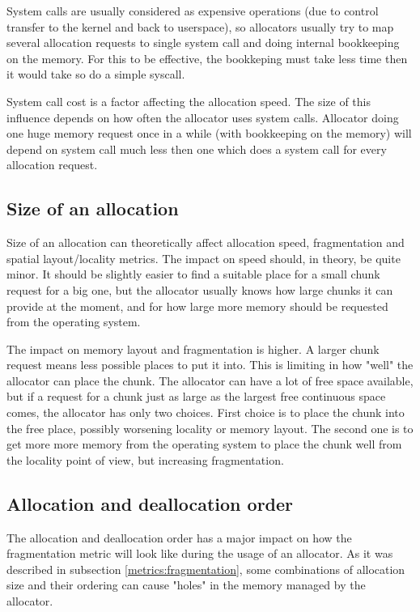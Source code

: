 System calls are usually considered as expensive operations (due to control transfer to the kernel and back to userspace), so allocators usually try to map several allocation requests to single system call and doing internal bookkeeping on the memory. For this to be effective, the bookkeping must take less time then it would take so do a simple syscall.

System call cost is a factor affecting the allocation speed. The size of this influence depends on how often the allocator uses system calls. Allocator doing one huge memory request once in a while (with bookkeeping on the memory) will depend on system call much less then one which does a system call for every allocation request.
\subsection{Size of an allocation}

Size of an allocation can theoretically affect allocation speed, fragmentation and spatial layout/locality metrics. The impact on speed should, in theory, be quite minor. It should be slightly easier to find a suitable place for a small chunk request for a big one, but the allocator usually knows how large chunks it can provide at the moment, and for how large more memory should be requested from the operating system.

The impact on memory layout and fragmentation is higher. A larger chunk request means less possible places to put it into. This is limiting in how "well" the allocator can place the chunk. The allocator can have a lot of free space available, but if a request for a chunk just as large as the largest free continuous space comes, the allocator has only two choices. First choice is to place the chunk into the free place, possibly worsening locality or memory layout. The second one is to get more more memory from the operating system to place the chunk well from the locality point of view, but increasing fragmentation.

\subsection{Allocation and deallocation order}

The allocation and deallocation order has a major impact on how the fragmentation metric will look like during the usage of an allocator. As it was described in subsection \ref{metrics:fragmentation}, some combinations of allocation size and their ordering can cause "holes" in the memory managed by the allocator.

